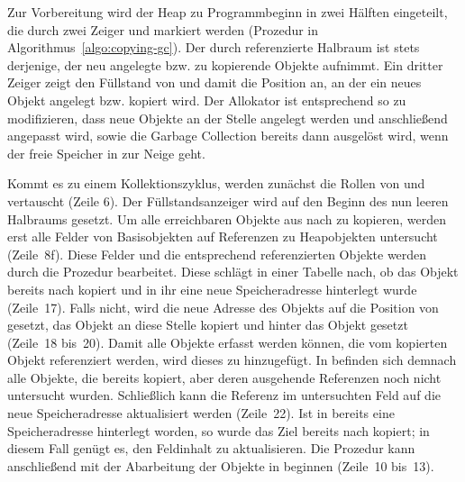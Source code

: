 Zur Vorbereitung wird der Heap zu Programmbeginn in zwei Hälften eingeteilt, die durch zwei Zeiger  und  markiert werden (Prozedur  in Algorithmus~\ref{algo:copying-gc}).
Der durch  referenzierte Halbraum ist stets derjenige, der neu angelegte bzw. zu kopierende Objekte aufnimmt.
Ein dritter Zeiger  zeigt den Füllstand von  und damit die Position an, an der ein neues Objekt angelegt bzw. kopiert wird.
Der Allokator ist entsprechend so zu modifizieren, dass neue Objekte an der Stelle  angelegt werden und  anschließend angepasst wird, sowie die Garbage Collection bereits dann ausgelöst wird, wenn der freie Speicher in  zur Neige geht.

Kommt es zu einem Kollektionszyklus, werden zunächst die Rollen von  und  vertauscht (Zeile 6).
Der Füllstandsanzeiger  wird auf den Beginn des nun leeren Halbraums  gesetzt.
Um alle erreichbaren Objekte aus  nach  zu kopieren, werden erst alle Felder von Basisobjekten auf Referenzen zu Heapobjekten untersucht (Zeile~8f).
Diese Felder und die entsprechend referenzierten Objekte werden durch die Prozedur  bearbeitet.
Diese schlägt in einer Tabelle  nach, ob das Objekt bereits nach  kopiert und in ihr eine neue Speicheradresse hinterlegt wurde (Zeile~17).
Falls nicht, wird die neue Adresse des Objekts auf die Position von  gesetzt, das Objekt an diese Stelle kopiert und  hinter das Objekt gesetzt (Zeile~18 bis~20).
Damit alle Objekte erfasst werden können, die vom kopierten Objekt referenziert werden, wird dieses zu  hinzugefügt.
In  befinden sich demnach alle Objekte, die bereits kopiert, aber deren ausgehende Referenzen noch nicht untersucht wurden.
Schließlich kann die Referenz im untersuchten Feld auf die neue Speicheradresse aktualisiert werden (Zeile~22).
Ist in  bereits eine Speicheradresse hinterlegt worden, so wurde das Ziel bereits nach  kopiert; in diesem Fall genügt es, den Feldinhalt zu aktualisieren.
Die Prozedur  kann anschließend mit der Abarbeitung der Objekte in  beginnen (Zeile~10 bis~13).

